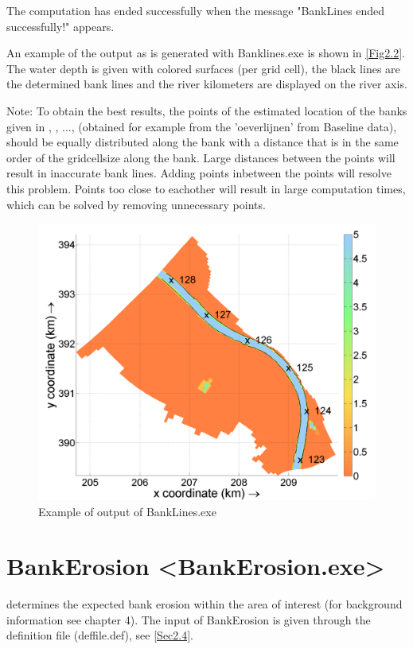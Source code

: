 The computation has ended successfully when the message "BankLines ended successfully!" appears.

An example of the output as is generated with Banklines.exe is shown in \autoref{Fig2.2}.
The water depth is given with colored surfaces (per grid cell), the black lines are the determined bank lines and the river kilometers are displayed on the river axis.

Note: To obtain the best results, the points of the estimated location of the banks given in  , , ...,  (obtained for example from the 'oeverlijnen' from Baseline data), should be equally distributed along the bank with a distance that is in the same order of the gridcellsize along the bank.
Large distances between the points will result in inaccurate bank lines.
Adding points inbetween the points will resolve this problem.
Points too close to eachother will result in large computation times, which can be solved by removing unnecessary points.

\begin{figure}
\includegraphics[width=\textwidth]{figures/Fig2-2.png}
\caption{Example of output of BankLines.exe}
\label{Fig2.2}
\end{figure}

\section{BankErosion <BankErosion.exe>}

determines the expected bank erosion within the area of interest (for background information see chapter 4).
The input of BankErosion  is given through the definition file (deffile.def), see \autoref{Sec2.4}.

